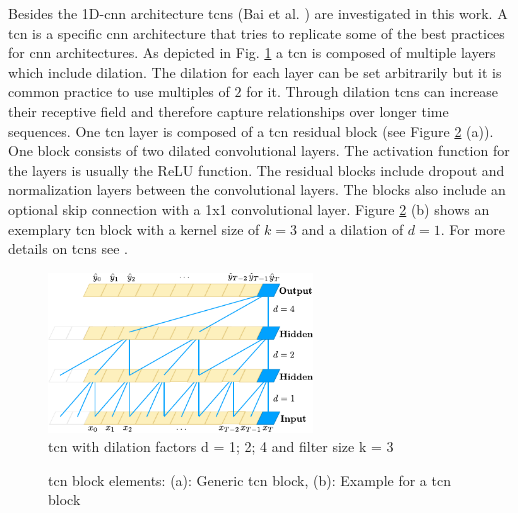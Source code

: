 \documentclass[conference]{IEEEtran}
\begin{document}
Besides the 1D-\gls{cnn} architecture \glspl{tcn} (Bai et al. \cite{Bai2018}) are investigated in this work. A \gls{tcn} is a specific \gls{cnn} architecture that tries to replicate some of the best practices for \gls{cnn} architectures. As depicted in Fig. \ref{fig:tcn_architecture} a \gls{tcn} is composed of multiple layers which include dilation. The dilation for each layer can be set arbitrarily but it is common practice to use multiples of $ 2 $ for it. Through dilation \glspl{tcn} can increase their receptive field and therefore capture relationships over longer time sequences. One \gls{tcn} layer is composed of a \gls{tcn} residual block (see Figure \ref{fig:tcn_block} (a)). One block consists of two dilated convolutional layers. The activation function for the layers is usually the ReLU function. The residual blocks include dropout and normalization layers between the convolutional layers. The blocks also include an optional skip connection with a 1x1 convolutional layer. Figure \ref{fig:tcn_block} (b) shows an exemplary \gls{tcn} block with a kernel size of $ k = 3 $ and a dilation of $ d = 1 $. For more details on \glspl{tcn} see \cite{Bai2018}.

\begin{figure}[htp]
	\centering
	\includegraphics[width=7cm]{tcn_architecture.pdf}
	\caption{\gls{tcn} with dilation factors d = 1; 2; 4 and filter size k = 3 \cite{Bai2018}}
	\label{fig:tcn_architecture}
\end{figure}

\begin{figure}[htp]
	\centering
	\quad
	\caption{\gls{tcn} block elements: (a): Generic \gls{tcn} block, (b): Example for a \gls{tcn} block \cite{Bai2018}}
	\label{fig:tcn_block}
\end{figure}
\end{document}
